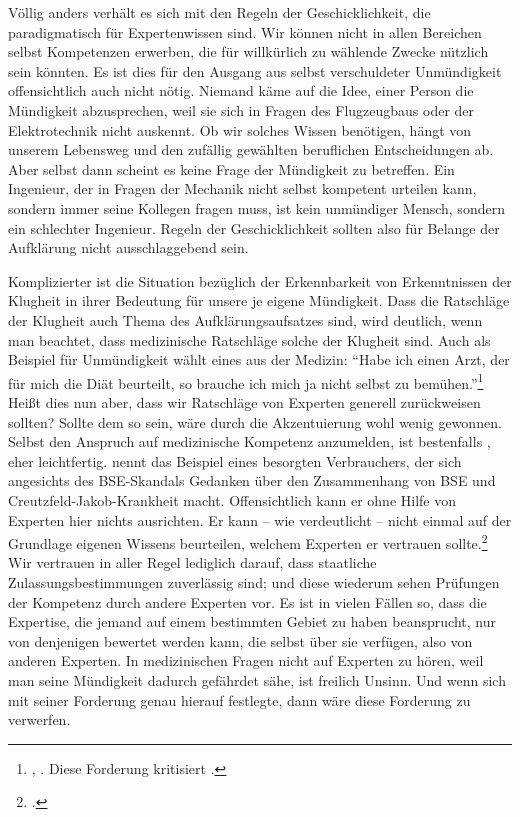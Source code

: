 Völlig anders verhält es sich mit den Regeln der Geschicklichkeit, die
paradigmatisch für Expertenwissen sind. Wir können nicht in allen Bereichen
selbst Kompetenzen erwerben, die für willkürlich zu wählende Zwecke nützlich
sein könnten. Es ist dies für den Ausgang aus selbst verschuldeter Unmündigkeit
offensichtlich auch nicht nötig. Niemand käme auf die Idee, einer Person die
Mündigkeit abzusprechen, weil sie sich in Fragen des Flugzeugbaus oder der
Elektrotechnik nicht auskennt. Ob wir solches Wissen benötigen, hängt von
unserem Lebensweg und den zufällig gewählten beruflichen Entscheidungen ab. Aber
selbst dann scheint es keine Frage der Mündigkeit zu betreffen. Ein Ingenieur,
der in Fragen der Mechanik nicht selbst kompetent urteilen kann, sondern immer
seine Kollegen fragen muss, ist kein unmündiger Mensch, sondern ein schlechter
Ingenieur. Regeln der Geschicklichkeit sollten also für Belange der Aufklärung
nicht ausschlaggebend sein.


Komplizierter ist die Situation bezüglich der Erkennbarkeit von Erkenntnissen
der Klugheit in ihrer Bedeutung für unsere je eigene Mündigkeit. Dass die
Ratschläge der Klugheit auch Thema des Aufklärungsaufsatzes sind, wird deutlich,
wenn man beachtet, dass medizinische Ratschläge solche der Klugheit sind. Auch
als Beispiel für Unmündigkeit wählt  eines aus der Medizin:
\enquote{Habe ich {\punkt} einen Arzt, der für mich die Diät beurteilt, {\punkt}
so brauche ich mich ja nicht selbst zu bemühen.}\footnote{\cite[][A
482]{Kant:BeantwortungderFrage:WasistAufklaerung?1977}, \cite[][VIII:
35.13--16]{Kant:GesammelteWerke1900ff.}. Diese Forderung kritisiert
\textcite[vgl.][258]{ONeill:Therhetoricofdeliberation2002}.} Heißt dies nun
aber, dass wir Ratschläge von Experten generell zurückweisen sollten? Sollte dem
so sein, wäre durch die Akzentuierung wohl wenig gewonnen. Selbst den Anspruch
auf medizinische Kompetenz anzumelden, ist bestenfalls ,
eher leichtfertig.  nennt
das Beispiel eines besorgten Verbrauchers, der sich angesichts des BSE-Skandals
Gedanken über den Zusammenhang von BSE und Creutzfeld-Jakob-Krankheit macht.
Offensichtlich kann er ohne Hilfe von Experten hier nichts ausrichten. Er kann
-- wie  verdeutlicht -- nicht
einmal auf der Grundlage eigenen Wissens beurteilen, welchem Experten er
vertrauen sollte.\footcite[Vgl.][257]{ONeill:Therhetoricofdeliberation2002} Wir
vertrauen in aller Regel lediglich darauf, dass staatliche
Zulassungsbestimmungen zuverlässig sind; und diese wiederum sehen Prüfungen der
Kompetenz durch andere Experten vor. Es ist in vielen Fällen so, dass die
Expertise, die jemand auf einem bestimmten Gebiet zu haben beansprucht, nur von
denjenigen bewertet werden kann, die selbst über sie verfügen, also von anderen
Experten. In medizinischen Fragen nicht auf Experten zu hören, weil man seine
Mündigkeit dadurch gefährdet sähe, ist freilich Unsinn.
Und wenn  sich mit seiner Forderung genau hierauf festlegte, dann
wäre diese Forderung zu verwerfen.

